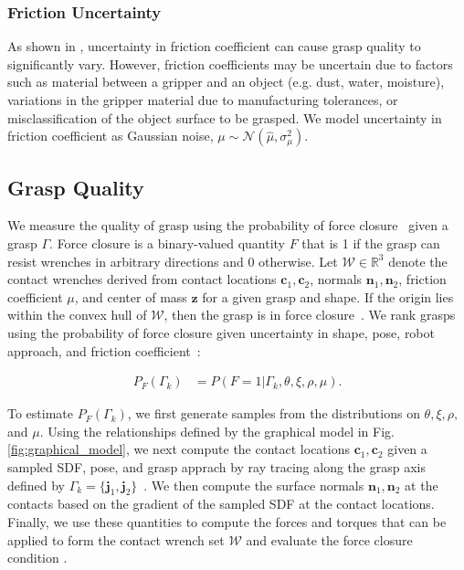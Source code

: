 \documentclass[10pt, conference]{ieeeconf}      %
\newcommand{\bc}{\mathbf{c}}
\newcommand{\bj}{\mathbf{j}}
\newcommand{\bn}{\mathbf{n}}
\newcommand{\bz}{\mathbf{z}}
\newcommand{\mN}{\mathcal{N}}
\newcommand{\mW}{\mathcal{W}}
\begin{document}
 \subsubsection{Friction Uncertainty}
As shown in \cite{zheng2005,hang2013a}, uncertainty in friction coefficient can cause grasp quality to significantly vary.
However, friction coefficients may be uncertain due to factors such as material between a gripper and an object (e.g. dust, water, moisture), variations in the gripper material due to manufacturing tolerances, or misclassification of the object surface to be grasped.
We model uncertainty in friction coefficient as Gaussian noise, $\mu \sim \mN(\hat{\mu},\sigma_{\mu}^2)$.

 
\subsection{Grasp Quality}\label{sec:grasp_sample}
We measure the quality of grasp using the probability of force closure~\cite{weisz2012pose, kim2012physically, kehoe2012estimating, kehoe2012toward} given a grasp $\Gamma$. Force closure is a binary-valued quantity $F$ that is 1 if the grasp can resist wrenches in arbitrary directions and 0 otherwise.
Let $\mW \in \mathbb{R}^3$ denote the contact wrenches derived from contact locations $\bc_1,\bc_2$, normals $\bn_1,\bn_2$, friction coefficient $\mu$, and center of mass $\bz$ for a given grasp and shape.
If the origin lies within the convex hull of $\mW$, then the grasp is in force closure~\cite{li1988task}.
We rank grasps using the probability of force closure given uncertainty in shape, pose, robot approach, and friction coefficient~\cite{christopoulos2007handling, kehoe2012toward}:

\vspace{-2ex}
\begin{align*}
	P_F(\Gamma_k) &= P \left(F = 1 | \Gamma_k, \theta, \xi, \rho, \mu \right).
\end{align*}
 
To estimate $P_F(\Gamma_k)$, we first generate samples from the distributions on $\theta, \xi, \rho,$ and $\mu$.
Using the relationships defined by the graphical model in Fig. \ref{fig:graphical_model}, we next compute the contact locations $\bc_1, \bc_2$ given a sampled SDF, pose, and grasp apprach by ray tracing along the grasp axis defined by $\Gamma_k = \lbrace \bj_1,\bj_2 \rbrace$~\cite{newcombe2011kinectfusion}.
We then compute the surface normals $\bn_1, \bn_2$ at the contacts based on the gradient of the sampled SDF at the contact locations.
Finally, we use these quantities to compute the forces and torques that can be applied to form the contact wrench set $\mW$ and evaluate the force closure condition \cite{li1988task}.
\end{document}
